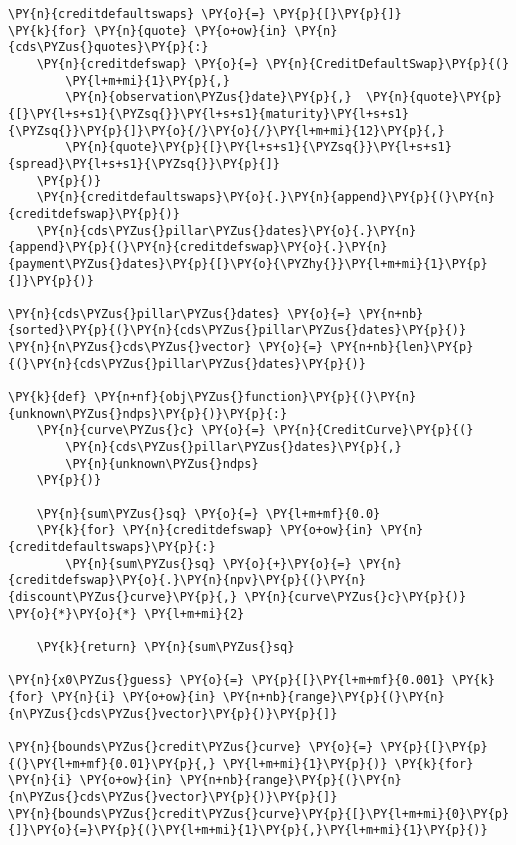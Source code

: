 \begin{Answer}
\begin{codebox}[size=fbox, boxrule=1pt, pad at break*=1mm,colback=cellbackground, colframe=cellborder]
\begin{Verbatim}[commandchars=\\\{\}]
\PY{n}{creditdefaultswaps} \PY{o}{=} \PY{p}{[}\PY{p}{]}
\PY{k}{for} \PY{n}{quote} \PY{o+ow}{in} \PY{n}{cds\PYZus{}quotes}\PY{p}{:}
    \PY{n}{creditdefswap} \PY{o}{=} \PY{n}{CreditDefaultSwap}\PY{p}{(}
        \PY{l+m+mi}{1}\PY{p}{,}            
        \PY{n}{observation\PYZus{}date}\PY{p}{,}  \PY{n}{quote}\PY{p}{[}\PY{l+s+s1}{\PYZsq{}}\PY{l+s+s1}{maturity}\PY{l+s+s1}{\PYZsq{}}\PY{p}{]}\PY{o}{/}\PY{o}{/}\PY{l+m+mi}{12}\PY{p}{,}
        \PY{n}{quote}\PY{p}{[}\PY{l+s+s1}{\PYZsq{}}\PY{l+s+s1}{spread}\PY{l+s+s1}{\PYZsq{}}\PY{p}{]}   
    \PY{p}{)}
    \PY{n}{creditdefaultswaps}\PY{o}{.}\PY{n}{append}\PY{p}{(}\PY{n}{creditdefswap}\PY{p}{)}
    \PY{n}{cds\PYZus{}pillar\PYZus{}dates}\PY{o}{.}\PY{n}{append}\PY{p}{(}\PY{n}{creditdefswap}\PY{o}{.}\PY{n}{payment\PYZus{}dates}\PY{p}{[}\PY{o}{\PYZhy{}}\PY{l+m+mi}{1}\PY{p}{]}\PY{p}{)}
    
\PY{n}{cds\PYZus{}pillar\PYZus{}dates} \PY{o}{=} \PY{n+nb}{sorted}\PY{p}{(}\PY{n}{cds\PYZus{}pillar\PYZus{}dates}\PY{p}{)}
\PY{n}{n\PYZus{}cds\PYZus{}vector} \PY{o}{=} \PY{n+nb}{len}\PY{p}{(}\PY{n}{cds\PYZus{}pillar\PYZus{}dates}\PY{p}{)}

\PY{k}{def} \PY{n+nf}{obj\PYZus{}function}\PY{p}{(}\PY{n}{unknown\PYZus{}ndps}\PY{p}{)}\PY{p}{:}
    \PY{n}{curve\PYZus{}c} \PY{o}{=} \PY{n}{CreditCurve}\PY{p}{(}
        \PY{n}{cds\PYZus{}pillar\PYZus{}dates}\PY{p}{,}
        \PY{n}{unknown\PYZus{}ndps}
    \PY{p}{)}

    \PY{n}{sum\PYZus{}sq} \PY{o}{=} \PY{l+m+mf}{0.0}
    \PY{k}{for} \PY{n}{creditdefswap} \PY{o+ow}{in} \PY{n}{creditdefaultswaps}\PY{p}{:}
        \PY{n}{sum\PYZus{}sq} \PY{o}{+}\PY{o}{=} \PY{n}{creditdefswap}\PY{o}{.}\PY{n}{npv}\PY{p}{(}\PY{n}{discount\PYZus{}curve}\PY{p}{,} \PY{n}{curve\PYZus{}c}\PY{p}{)} \PY{o}{*}\PY{o}{*} \PY{l+m+mi}{2}

    \PY{k}{return} \PY{n}{sum\PYZus{}sq}

\PY{n}{x0\PYZus{}guess} \PY{o}{=} \PY{p}{[}\PY{l+m+mf}{0.001} \PY{k}{for} \PY{n}{i} \PY{o+ow}{in} \PY{n+nb}{range}\PY{p}{(}\PY{n}{n\PYZus{}cds\PYZus{}vector}\PY{p}{)}\PY{p}{]}

\PY{n}{bounds\PYZus{}credit\PYZus{}curve} \PY{o}{=} \PY{p}{[}\PY{p}{(}\PY{l+m+mf}{0.01}\PY{p}{,} \PY{l+m+mi}{1}\PY{p}{)} \PY{k}{for} \PY{n}{i} \PY{o+ow}{in} \PY{n+nb}{range}\PY{p}{(}\PY{n}{n\PYZus{}cds\PYZus{}vector}\PY{p}{)}\PY{p}{]}
\PY{n}{bounds\PYZus{}credit\PYZus{}curve}\PY{p}{[}\PY{l+m+mi}{0}\PY{p}{]}\PY{o}{=}\PY{p}{(}\PY{l+m+mi}{1}\PY{p}{,}\PY{l+m+mi}{1}\PY{p}{)}
\end{Verbatim}
\end{codebox}


\end{Answer}
